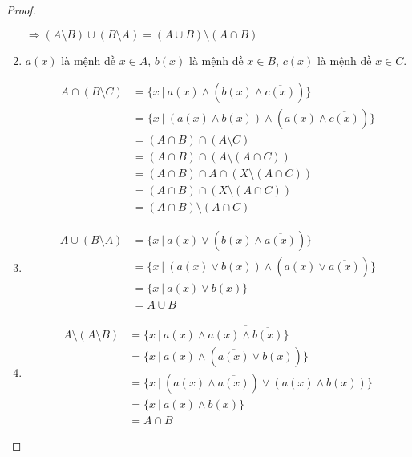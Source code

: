 \documentclass[class=linearalgebra,crop=false]{standalone}
\begin{document}
\begin{proof}
\begin{enumerate}[label = (\alph*)]
        $\Rightarrow (A\setminus B)\cup (B\setminus A) = (A\cup B)\setminus (A\cap B)$

        \item $a(x)$ là mệnh đề $x \in A$, $b(x)$ là mệnh đề $x\in B$, $c(x)$ là mệnh đề $x\in C$.

        \begin{align*}
            A\cap (B\setminus C) &= \{ x\ |\ a(x) \wedge (b(x) \wedge \overline{c(x)}) \} \\
                                 &= \{ x\ |\ (a(x) \wedge b(x)) \wedge (a(x) \wedge\overline{c(x)}) \} \\
                                 &= (A\cap B) \cap (A\setminus C) \\
                                 &= (A\cap B) \cap (A\setminus (A\cap C)) \\
                                 &= (A\cap B) \cap A \cap (X \setminus (A\cap C)) \\
                                 &= (A\cap B) \cap (X \setminus (A\cap C)) \\
                                 &= (A\cap B) \setminus (A\cap C)
        \end{align*}

        \item

        \begin{align*}
            A\cup (B\setminus A) &= \{ x\ |\ a(x) \vee (b(x) \wedge \overline{a(x)}) \} \\
                                 &= \{ x\ |\ (a(x) \vee b(x)) \wedge (a(x) \vee \overline{a(x)}) \} \\
                                 &= \{ x\ |\ a(x)\vee b(x) \} \\
                                 &= A\cup B
        \end{align*}

        \item

        \begin{align*}
            A\setminus (A\setminus B)&= \{ x\ |\ a(x) \wedge \overline{a(x)\wedge \overline{b(x)}} \} \\
                                     &= \{ x\ |\ a(x) \wedge (\overline{a(x)} \vee b(x)) \} \\
                                     &= \{ x\ |\ (a(x) \wedge \overline{a(x)}) \vee (a(x) \wedge b(x)) \} \\
                                     &= \{ x\ |\ a(x) \wedge b(x) \} \\
                                     &= A\cap B
        \end{align*}
    \end{enumerate}
\end{proof}
\end{document}
